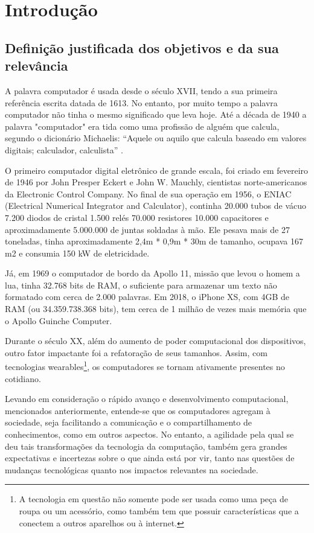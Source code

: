 \section{Introdução} 
\subsection{Definição justificada dos objetivos e da sua relevância}
A palavra computador é usada desde o século XVII, tendo a sua primeira referência escrita datada de 1613. No entanto, por muito tempo a palavra computador não tinha o mesmo significado que leva hoje. Até a década de 1940 a palavra "computador" era tida como uma profissão de alguém que calcula, segundo o dicionário Michaelis: “Aquele ou aquilo que calcula baseado em valores digitais; calculador, calculista” \cite{MichaelsComputador}.

O primeiro computador digital eletrônico de grande escala, foi criado em fevereiro de 1946 por John Presper Eckert e John W. Mauchly, cientistas norte-americanos da Electronic Control Company. No final de sua operação em 1956, o ENIAC (Electrical Numerical Integrator and Calculator), continha 20.000 tubos de vácuo 7.200 diodos de cristal 1.500 relés 70.000 resistores 10.000 capacitores e aproximadamente 5.000.000 de juntas soldadas à mão. Ele pesava mais de 27 toneladas, tinha aproximadamente 2,4m * 0,9m * 30m de tamanho, ocupava 167 m2 e consumia 150 kW de eletricidade. \cite{WazlawickHistoriaDaComputacao}

Já, em 1969 o computador de bordo da Apollo 11, missão que levou o homem a lua, tinha 32.768 bits de RAM, o suficiente para armazenar um texto não formatado com cerca de 2.000 palavras. Em 2018, o iPhone XS, com 4GB de RAM (ou 34.359.738.368 bits), tem cerca de 1 milhão de vezes mais memória que o Apollo Guinche Computer. \cite{UolIphoneVsAppolo}

Durante o século XX, além do aumento de poder computacional dos dispositivos, outro fator impactante foi a refatoração de seus tamanhos. Assim, com tecnologias wearables\footnote{A tecnologia em questão não somente pode ser usada como uma peça de roupa ou um acessório, como também tem que possuir características que a conectem a outros aparelhos ou à internet.}, os computadores se tornam ativamente presentes no cotidiano.

Levando em consideração o rápido avanço e desenvolvimento computacional, mencionados anteriormente, entende-se que os computadores agregam à sociedade, seja facilitando a comunicação e o compartilhamento de conhecimentos, como em outros aspectos. No entanto, a agilidade pela qual se deu tais transformações da tecnologia da computação, também gera grandes expectativas e incertezas sobre o que ainda está por vir, tanto nas questões de mudanças tecnológicas quanto nos impactos relevantes na sociedade.

